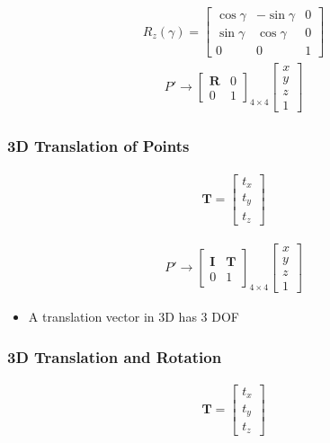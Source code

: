 \documentclass[letterpaper,12pt]{article}
\newcommand{\lra}{\ensuremath{\longrightarrow{}}}
\newcommand{\vect}[1]{\mathbf{#1}}
\newcommand{\matr}[1]{\mathbf{#1}}
\begin{document}
\begin{align}
 R_z(\gamma) = \begin{bmatrix}
  \cos\gamma & -\sin\gamma & 0 \\
  \sin\gamma & \cos\gamma  & 0 \\
  0          & 0           & 1
 \end{bmatrix}
\end{align}
\begin{align}
 P' \lra \begin{bmatrix}
  \matr{R} & 0 \\
  0        & 1
 \end{bmatrix}_{4 \times 4}
 \begin{bmatrix}
  x \\
  y \\
  z \\
  1
 \end{bmatrix}
\end{align}

\subsubsection{3D Translation of Points}
\begin{align}
 \vect{T} = \begin{bmatrix}
  t_x \\
  t_y \\
  t_z
 \end{bmatrix}
\end{align}

\begin{align}
 P' \lra \begin{bmatrix}
  \matr{I} & \vect{T} \\
  0        & 1
 \end{bmatrix}_{4 \times 4}
 \begin{bmatrix}
  x \\
  y \\
  z \\
  1
 \end{bmatrix}
\end{align}
\begin{itemize}
 \item A translation vector in 3D has 3 DOF
\end{itemize}

\subsubsection{3D Translation and Rotation}
\begin{align}
 \vect{T} = \begin{bmatrix}
  t_x \\
  t_y \\
  t_z
 \end{bmatrix}
\end{align}
\end{document}
